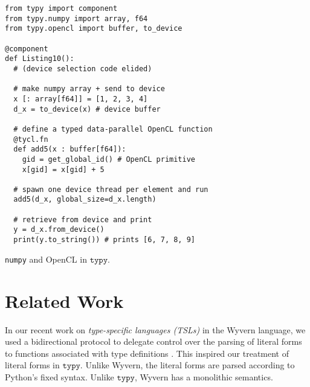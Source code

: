 \documentclass[preprint,10pt]{sigplanconf}
\newcommand{\typy}{\texttt{typy}}
\newcommand{\lip}[1]{\lstinline[language=Python,basicstyle=\ttfamily\footnotesize,deletendkeywords={tuple,buffer,map}]{#1}}
\newcommand{\li}[1]{\lip{#1}}
\begin{document}
\begin{codelisting}[t]
\vspace{-3px}
\begin{lstlisting}
from typy import component
from typy.numpy import array, f64
from typy.opencl import buffer, to_device

@component
def Listing10():
  # (device selection code elided)

  # make numpy array + send to device
  x [: array[f64]] = [1, 2, 3, 4]
  d_x = to_device(x) # device buffer

  # define a typed data-parallel OpenCL function
  @tycl.fn
  def add5(x : buffer[f64]):
    gid = get_global_id() # OpenCL primitive
    x[gid] = x[gid] + 5

  # spawn one device thread per element and run
  add5(d_x, global_size=d_x.length)

  # retrieve from device and print
  y = d_x.from_device()
  print(y.to_string()) # prints [6, 7, 8, 9]
\end{lstlisting}
\caption{\li{numpy} and OpenCL in $\typy$.}
\label{fig:numerics}
\end{codelisting}

\section{Related Work}\label{related}\label{sec:related-work}

%




In our recent work on \emph{type-specific languages (TSLs)} in the Wyvern language, we used a bidirectional protocol to delegate control over the parsing of literal forms to functions associated with type definitions \cite{TSLs,sac15}. This inspired our treatment of literal forms in $\typy$. Unlike Wyvern, the literal forms are parsed according to Python's fixed syntax. Unlike $\typy$, Wyvern has a monolithic semantics. %
\end{document}

